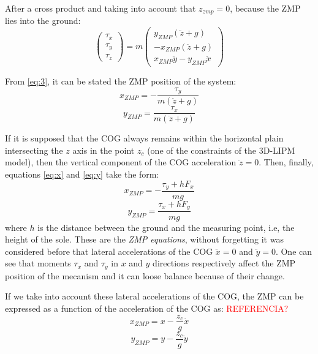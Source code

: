 After a cross product and taking into account that $z_{zmp} = 0$, because the ZMP lies into the ground:
\begin{equation}
\begin{pmatrix}
\tau_x \\
\tau_y \\
\tau_z 
\end{pmatrix} 
= m
\begin{pmatrix}
y_{ZMP}(\ddot{z}+g) \\
-x_{ZMP}(\ddot{z}+g) \\
x_{ZMP}\ddot{y}-y_{ZMP}\ddot{x}
\end{pmatrix}
\label{eq:3}
\end{equation}

From \eqref{eq:3}, it can be stated the ZMP position of the system:
\begin{equation}
x_{ZMP} = -\frac{\tau_y}{m(\ddot{z}+g)}
\label{eq:x}
\end{equation}
\begin{equation}
y_{ZMP} = \frac{\tau_x}{m(\ddot{z}+g)}
\label{eq:y}
\end{equation}

If it is supposed that the COG always remains within the horizontal plain intersecting the $z$ axis in the point $z_c$ (one of the constraints of the 3D-LIPM model), then the vertical component of the COG acceleration $\ddot{z}=0$. Then, finally, equations \ref{eq:x} and \ref{eq:y} take the form:
\begin{equation}
x_{ZMP} = -\frac{\tau_y+hF_x}{mg}
\label{eq:xzmp}
\end{equation}
\begin{equation}
y_{ZMP} = \frac{\tau_x+hF_y}{mg}
\label{eq:yzmp}
\end{equation}
where $h$ is the distance between the ground and the measuring point, i.e, the height of the sole. 
These are the \textit{ZMP equations}, without forgetting it was considered before that lateral accelerations of the COG $\ddot{x}=0$ and $\ddot{y}=0$. One can see that moments $\tau_x$ and $\tau_y$ in $x$ and $y$ directions respectively affect the ZMP position of the mecanism and it can loose balance because of their change.

If we take into account these lateral accelerations of the COG, the ZMP can be expressed as a function of the acceleration of the COG as: \textcolor{red}{REFERENCIA?}
\begin{equation}
x_{ZMP}=x-\frac{z_c}{g}\ddot{x}
\end{equation}
\begin{equation}
y_{ZMP}=y-\frac{z_c}{g}\ddot{y}
\end{equation}


